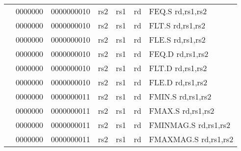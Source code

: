 \begin{table}[p]
\begin{small}
\begin{center}
\begin{tabular}{rcccccccccl}
&
\multicolumn{1}{|c|}{0000000} &
\multicolumn{5}{c|}{0000000010} &
\multicolumn{1}{c|}{rs2} &
\multicolumn{1}{c|}{rs1} &
\multicolumn{1}{c|}{rd} & FEQ.S rd,rs1,rs2 \\
\cline{2-10}
  

&
\multicolumn{1}{|c|}{0000000} &
\multicolumn{5}{c|}{0000000010} &
\multicolumn{1}{c|}{rs2} &
\multicolumn{1}{c|}{rs1} &
\multicolumn{1}{c|}{rd} & FLT.S rd,rs1,rs2 \\
\cline{2-10}
  

&
\multicolumn{1}{|c|}{0000000} &
\multicolumn{5}{c|}{0000000010} &
\multicolumn{1}{c|}{rs2} &
\multicolumn{1}{c|}{rs1} &
\multicolumn{1}{c|}{rd} & FLE.S rd,rs1,rs2 \\
\cline{2-10}
  

&
\multicolumn{1}{|c|}{0000000} &
\multicolumn{5}{c|}{0000000010} &
\multicolumn{1}{c|}{rs2} &
\multicolumn{1}{c|}{rs1} &
\multicolumn{1}{c|}{rd} & FEQ.D rd,rs1,rs2 \\
\cline{2-10}
  

&
\multicolumn{1}{|c|}{0000000} &
\multicolumn{5}{c|}{0000000010} &
\multicolumn{1}{c|}{rs2} &
\multicolumn{1}{c|}{rs1} &
\multicolumn{1}{c|}{rd} & FLT.D rd,rs1,rs2 \\
\cline{2-10}
  

&
\multicolumn{1}{|c|}{0000000} &
\multicolumn{5}{c|}{0000000010} &
\multicolumn{1}{c|}{rs2} &
\multicolumn{1}{c|}{rs1} &
\multicolumn{1}{c|}{rd} & FLE.D rd,rs1,rs2 \\
\cline{2-10}
  

&
\multicolumn{1}{|c|}{0000000} &
\multicolumn{5}{c|}{0000000011} &
\multicolumn{1}{c|}{rs2} &
\multicolumn{1}{c|}{rs1} &
\multicolumn{1}{c|}{rd} & FMIN.S rd,rs1,rs2 \\
\cline{2-10}
  

&
\multicolumn{1}{|c|}{0000000} &
\multicolumn{5}{c|}{0000000011} &
\multicolumn{1}{c|}{rs2} &
\multicolumn{1}{c|}{rs1} &
\multicolumn{1}{c|}{rd} & FMAX.S rd,rs1,rs2 \\
\cline{2-10}
  

&
\multicolumn{1}{|c|}{0000000} &
\multicolumn{5}{c|}{0000000011} &
\multicolumn{1}{c|}{rs2} &
\multicolumn{1}{c|}{rs1} &
\multicolumn{1}{c|}{rd} & FMINMAG.S rd,rs1,rs2 \\
\cline{2-10}
  

&
\multicolumn{1}{|c|}{0000000} &
\multicolumn{5}{c|}{0000000011} &
\multicolumn{1}{c|}{rs2} &
\multicolumn{1}{c|}{rs1} &
\multicolumn{1}{c|}{rd} & FMAXMAG.S rd,rs1,rs2 \\
\cline{2-10}
  


\end{tabular}
\end{center}
\end{small}
\end{table}
